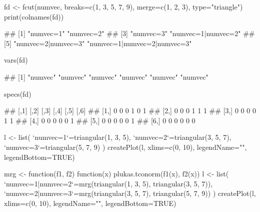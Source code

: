 \documentclass{article}\usepackage[]{graphicx}\usepackage[]{color}
\begin{document}
\begin{Schunk}
% --begin: "fcut.merge2"
\begin{Sinput}
fd <- fcut(numvec,
           breaks=c(1, 3, 5, 7, 9),
           merge=c(1, 2, 3),
           type="triangle")
print(colnames(fd))
\end{Sinput}
\begin{Soutput}
## [1] "numvec=1"                   "numvec=2"                  
## [3] "numvec=3"                   "numvec=1|numvec=2"         
## [5] "numvec=2|numvec=3"          "numvec=1|numvec=2|numvec=3"
\end{Soutput}
%
% --end: "fcut.merge2"
\end{Schunk}

\begin{Schunk}
% --begin: "fcut.varsspecs"
\begin{Sinput}
vars(fd)
\end{Sinput}
\begin{Soutput}
## [1] "numvec" "numvec" "numvec" "numvec" "numvec" "numvec"
\end{Soutput}
\begin{Sinput}
specs(fd)
\end{Sinput}
\begin{Soutput}
##      [,1] [,2] [,3] [,4] [,5] [,6]
## [1,]    0    0    0    1    0    1
## [2,]    0    0    0    1    1    1
## [3,]    0    0    0    0    1    1
## [4,]    0    0    0    0    0    1
## [5,]    0    0    0    0    0    1
## [6,]    0    0    0    0    0    0
\end{Soutput}
%
% --end: "fcut.varsspecs"
\end{Schunk}


\begin{Schunk}
\begin{Sinput}
l <- list(
  `numvec=1`=triangular(1, 3, 5),
  `numvec=2`=triangular(3, 5, 7),
  `numvec=3`=triangular(5, 7, 9)
)
createPlot(l, xlims=c(0, 10), legendName="", legendBottom=TRUE)
\end{Sinput}
\end{Schunk}

\begin{Schunk}
\begin{Sinput}
mrg <- function(f1, f2) {
  function(x) {
    plukas.tconorm(f1(x), f2(x))
  }
}
l <- list(
  `numvec=1|numvec=2`=mrg(triangular(1, 3, 5), triangular(3, 5, 7)),
  `numvec=2|numvec=3`=mrg(triangular(3, 5, 7), triangular(5, 7, 9))
)
createPlot(l, xlims=c(0, 10), legendName="", legendBottom=TRUE)
\end{Sinput}
\end{Schunk}
\end{document}
